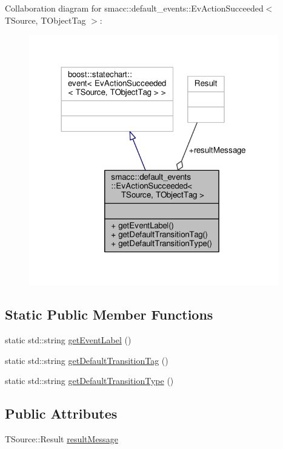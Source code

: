 Collaboration diagram for smacc\+:\+:default\+\_\+events\+:\+:Ev\+Action\+Succeeded$<$ T\+Source, T\+Object\+Tag $>$\+:\nopagebreak
\begin{figure}[H]
\begin{center}
\leavevmode
\includegraphics[width=308pt]{structsmacc_1_1default__events_1_1EvActionSucceeded__coll__graph}
\end{center}
\end{figure}
\subsection*{Static Public Member Functions}
\begin{DoxyCompactItemize}
\item 
static std\+::string \hyperlink{structsmacc_1_1default__events_1_1EvActionSucceeded_a8d002ec0ef39a71d54469fe274ac8c2a}{get\+Event\+Label} ()
\item 
static std\+::string \hyperlink{structsmacc_1_1default__events_1_1EvActionSucceeded_aceba175d35d94315204cb075ad5d103e}{get\+Default\+Transition\+Tag} ()
\item 
static std\+::string \hyperlink{structsmacc_1_1default__events_1_1EvActionSucceeded_a2314ed322e122576381e35986249c68f}{get\+Default\+Transition\+Type} ()
\end{DoxyCompactItemize}
\subsection*{Public Attributes}
\begin{DoxyCompactItemize}
\item 
T\+Source\+::\+Result \hyperlink{structsmacc_1_1default__events_1_1EvActionSucceeded_a5178997ebcf9a7a738e0bda57bd658d1}{result\+Message}
\end{DoxyCompactItemize}


